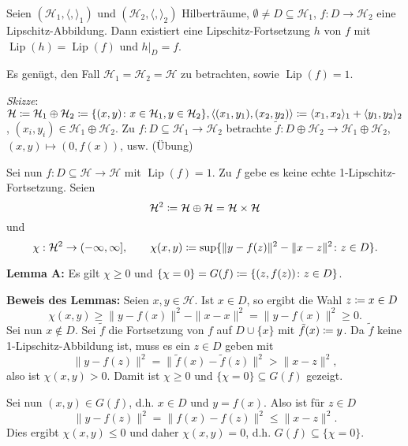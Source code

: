 \documentclass[a4paper,twoside,DIV15,BCOR12mm]{scrbook}
\newcommand{\HR}{\mathcal H}
\DeclareMathOperator{\Lip}{Lip}
\begin{document}
\begin{satz}
Seien \((\HR_1, \langle,\rangle_1)\) und \((\HR_2, \langle,\rangle_2)\) Hilberträume, \(\emptyset \neq D \subseteq \HR_1\),
\(f:D\rightarrow \HR_2\) eine Lipschitz-Abbildung. Dann existiert eine Lipschitz-Fortsetzung \(h\) von \(f\) mit \(\Lip(h)=\Lip(f)\) und \(h|_D = f\).
\end{satz}
\begin{beweis}
Es genügt, den Fall \(\HR_1 = \HR_2 = \HR\) zu betrachten, sowie \(\Lip(f)=1\).

\emph{Skizze}: \(\HR \da \HR_1 \oplus \HR_2 \da \{ (x,y) \colon x \in \HR_1, y \in \HR_2\}, \langle (x_1,y_1), (x_2,y_2) \rangle \da \langle x_1,x_2\rangle_1 + \langle y_1,y_2 \rangle_2\), \((x_i,y_i) \in \HR_1 \oplus \HR_2\).
Zu \(f:D \subseteq \HR_1 \rightarrow \HR_2\) betrachte \(\tilde f: D \oplus \HR_2 \rightarrow \HR_1 \oplus \HR_2\), \((x,y) \mapsto (0,f(x))\), usw. (Übung)

Sei nun \(f: D \subseteq \HR \rightarrow \HR\) mit \(\Lip(f)=1\). Zu \(f\) gebe es keine echte 1-Lipschitz-Fortsetzung. Seien
\[\HR^2 \da \HR \oplus \HR = \HR \times \HR\]
und \[\chi: \HR^2 \rightarrow (-\infty, \infty], \qquad\chi(x,y) \da \sup\{ \|y-f(z)\|^2 - \|x-z\|^2 \colon z \in D\}.\]

\textbf{Lemma A:}
Es gilt \(\chi \geq 0\) und \(\{\chi=0\} = G(f) \da \{(z,f(z)) \colon z \in D\}\).

\textbf{Beweis des Lemmas:}
Seien \(x,y \in \HR\). Ist \(x \in D\), so ergibt die Wahl \(z \da x \in D\)
\[\chi(x,y) \geq \|y-f(x)\|^2 - \|x-x\|^2 = \|y-f(x)\|^2 \geq 0.\] 
Sei nun \(x \notin D\). Sei \(\tilde f\) die Fortsetzung von \(f\) auf \(D \cup \{x\}\) mit \(\tilde f(x) \da y\). Da \(\tilde f\) keine 1-Lipschitz-Abbildung ist, muss es ein \(z \in D\) geben mit
\[
\|y-f(z)\|^2 = \|\tilde f(x) - \tilde f(z)\|^2 > \|x-z\|^2,
\]
also ist \(\chi(x,y) > 0\). Damit ist \(\chi \geq 0 \) und \(\{\chi = 0\} \subseteq G(f)\) gezeigt.
\par
Sei nun \((x,y) \in G(f)\), d.h. \(x\in D\) und \(y=f(x)\). Also ist für $z\in D$
\[
\|y-f(z)\|^2 = \|f(x)-f(z)\|^2 \leq \|x-z\|^2.
\]
Dies ergibt \(\chi(x,y) \leq 0\) und daher \( \chi(x,y) = 0\), d.h. \(G(f) \subseteq \{\chi=0\}\).


\end{beweis}
\end{document}
